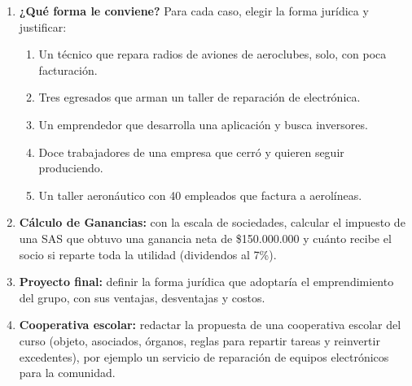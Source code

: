 \begin{enumerate}
  \item \textbf{¿Qué forma le conviene?} Para cada caso, elegir la forma jurídica y
        justificar:
  \begin{enumerate}
    \item Un técnico que repara radios de aviones de aeroclubes, solo, con poca facturación.
    \item Tres egresados que arman un taller de reparación de electrónica.
    \item Un emprendedor que desarrolla una aplicación y busca inversores.
    \item Doce trabajadores de una empresa que cerró y quieren seguir produciendo.
    \item Un taller aeronáutico con 40 empleados que factura a aerolíneas.
  \end{enumerate}
  \item \textbf{Cálculo de Ganancias:} con la escala de sociedades, calcular el impuesto de una
        SAS que obtuvo una ganancia neta de \$150.000.000 y cuánto recibe el socio si reparte
        toda la utilidad (dividendos al 7\%).
  \item \textbf{Proyecto final:} definir la forma jurídica que adoptaría el emprendimiento del
        grupo, con sus ventajas, desventajas y costos.
  \item \textbf{Cooperativa escolar:} redactar la propuesta de una cooperativa escolar del
        curso (objeto, asociados, órganos, reglas para repartir tareas y reinvertir
        excedentes), por ejemplo un servicio de reparación de equipos electrónicos para la
        comunidad.
\end{enumerate}
